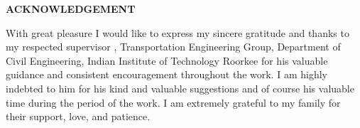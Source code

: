 \begin{center}
\vspace{1.3cm}
\textbf{\textbf{\fontsize{16pt}{24pt}\selectfont ACKNOWLEDGEMENT}}
\end{center}

\vspace{1.3cm}

\fontsize{12pt}{24pt}\selectfont 
With great pleasure I would like to express my sincere gratitude and thanks to my respected supervisor \textbf{\guide}, Transportation Engineering Group, Department of Civil Engineering, Indian Institute of Technology Roorkee for his valuable guidance and consistent encouragement throughout the work. I am highly indebted to him for his kind and valuable suggestions and of course his valuable time during the period of the work. I am extremely grateful to my family for their support, love, and patience.\\
